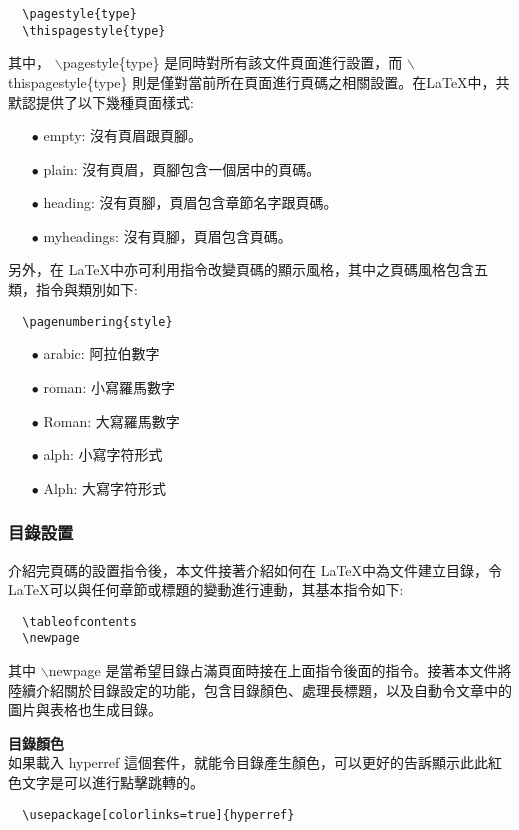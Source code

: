 \bigskip
\begin{lstlisting}
  \pagestyle{type}
  \thispagestyle{type}
\end{lstlisting}


其中， {\A $\backslash$pagestyle\{type\}} 是同時對所有該文件頁面進行設置，而 {\A $\backslash$thispagestyle\{type\}}  則是僅對當前所在頁面進行頁碼之相關設置。在\LaTeX 中，共默認提供了以下幾種頁面樣式:
\begin{itemize}
\item[$\bullet$] empty: 沒有頁眉跟頁腳。
\item[$\bullet$] plain: 沒有頁眉，頁腳包含一個居中的頁碼。
\item[$\bullet$] heading: 沒有頁腳，頁眉包含章節名字跟頁碼。
\item[$\bullet$] myheadings: 沒有頁腳，頁眉包含頁碼。
\end{itemize}
另外，在 \LaTeX 中亦可利用指令改變頁碼的顯示風格，其中之頁碼風格包含五類，指令與類別如下:

\bigskip
\begin{lstlisting}
  \pagenumbering{style}
\end{lstlisting}

\begin{itemize}
\item[$\bullet$] arabic: 阿拉伯數字
\item[$\bullet$] roman: 小寫羅馬數字
\item[$\bullet$] Roman: 大寫羅馬數字
\item[$\bullet$] alph: 小寫字符形式
\item[$\bullet$] Alph: 大寫字符形式
\end{itemize}

\subsubsection{目錄設置}
介紹完頁碼的設置指令後，本文件接著介紹如何在 \LaTeX 中為文件建立目錄，令 \LaTeX 可以與任何章節或標題的變動進行連動，其基本指令如下:

\bigskip
\begin{lstlisting}
  \tableofcontents
  \newpage
\end{lstlisting}

其中 {\A $\backslash$newpage} 是當希望目錄占滿頁面時接在上面指令後面的指令。接著本文件將陸續介紹關於目錄設定的功能，包含目錄顏色、處理長標題，以及自動令文章中的圖片與表格也生成目錄。

\textbf{目錄顏色}\\
如果載入 hyperref 這個套件，就能令目錄產生顏色，可以更好的告訴顯示此此紅色文字是可以進行點擊跳轉的。
\bigskip
	\begin{lstlisting}
  \usepackage[colorlinks=true]{hyperref}
	\end{lstlisting}

